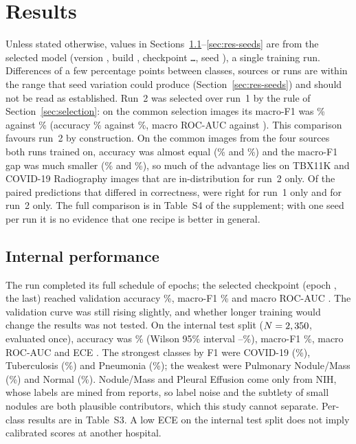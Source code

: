 \section{Results}
\label{sec:results}

Unless stated otherwise, values in Sections~\ref{sec:res-internal}--\ref{sec:res-seeds} are from the selected model (version \RModelVersion, build \RDatasetBuild, checkpoint \texttt{\RCheckpointShort\ldots}, seed \RSeed), a single training run. Differences of a few percentage points between classes, sources or runs are within the range that seed variation could produce (Section~\ref{sec:res-seeds}) and should not be read as established. Run~2 was selected over run~1 by the rule of Section~\ref{sec:selection}: on the \RCmpN{} common selection images its macro-F1 was \RCmpRunTwoMacroFOne\% against \RCmpRunOneMacroFOne\% (accuracy \RCmpRunTwoAcc\% against \RCmpRunOneAcc\%, macro ROC-AUC \RCmpRunTwoMacroAUC{} against \RCmpRunOneMacroAUC). This comparison favours run~2 by construction. On the \RCmpRunOneSharedN{} common images from the four sources both runs trained on, accuracy was almost equal (\RCmpRunOneSharedAcc\% and \RCmpRunTwoSharedAcc\%) and the macro-F1 gap was much smaller (\RCmpRunOneSharedMacroFOne\% and \RCmpRunTwoSharedMacroFOne\%), so much of the advantage lies on TBX11K and COVID-19 Radiography images that are in-distribution for run~2 only. Of the paired predictions that differed in correctness, \RCmpMcNemarB{} were right for run~1 only and \RCmpMcNemarC{} for run~2 only. The full comparison is in Table~S4 of the supplement; with one seed per run it is no evidence that one recipe is better in general.

\subsection{Internal performance}
\label{sec:res-internal}
The run completed its full schedule of \REpochsTrained{} epochs; the selected checkpoint (epoch \RSelectedEpoch, the last) reached validation accuracy \RValAcc\%, macro-F1 \RValMacroFOne\% and macro ROC-AUC \RValMacroAUC. The validation curve was still rising slightly, and whether longer training would change the results was not tested. On the internal test split ($N=2,350$, evaluated once), accuracy was \RTestAcc\% (Wilson 95\% interval \RTestAccLo--\RTestAccHi\%), macro-F1 \RTestMacroFOne\%, macro ROC-AUC \RTestMacroAUC{} and ECE \RTestECE. The strongest classes by F1 were COVID-19 (\RFOneCovid\%), Tuberculosis (\RFOneTB\%) and Pneumonia (\RFOnePneumonia\%); the weakest were Pulmonary Nodule/Mass (\RFOneNodule\%) and Normal (\RFOneNormal\%). Nodule/Mass and Pleural Effusion come only from NIH, whose labels are mined from reports, so label noise and the subtlety of small nodules are both plausible contributors, which this study cannot separate. Per-class results are in Table~S3. A low ECE on the internal test split does not imply calibrated scores at another hospital.

